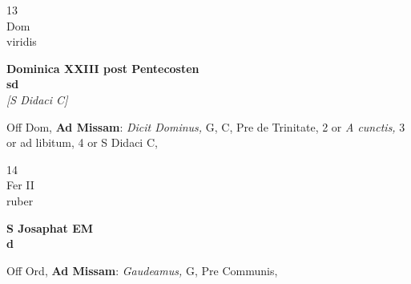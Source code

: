 \documentclass[10pt, openany]{book}
\begin{document}
        \begin{center}
            \begin{minipage}{3.5in}
                \vspace{2em}
                \begin{minipage}{0.5in}
                    {\Huge 13} \\
                    {\normalsize Dom} \\
                    {\normalsize viridis}
                \end{minipage}
                \begin{minipage}{3.0in}
                    \textbf{ \large Dominica XXIII post Pentecosten \\
                    \textnormal{\normalsize sd}} \\ \textit{[S Didaci C]} \\ 
                \end{minipage}
                \begin{justify}Off Dom, \textbf{Ad Missam}: \textit{Dicit Dominus,} G, C, Pre de Trinitate, 2 or \textit{A cunctis,} 3 or ad libitum, 4 or S Didaci C,   
                \end{justify}
            \end{minipage}
        \end{center}
    
        \begin{center}
            \begin{minipage}{3.5in}
                \vspace{2em}
                \begin{minipage}{0.5in}
                    {\Huge 14} \\
                    {\normalsize Fer II} \\
                    {\normalsize ruber}
                \end{minipage}
                \begin{minipage}{3.0in}
                    \textbf{ \large S Josaphat EM \\
                    \textnormal{\normalsize d}} \\ 
                \end{minipage}
                \begin{justify}Off Ord, \textbf{Ad Missam}: \textit{Gaudeamus,} G, Pre Communis,   
                \end{justify}
            \end{minipage}
        \end{center}
    
\end{document}
